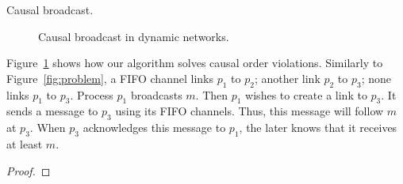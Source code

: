 \begin{algorithm*}[h]
  
  \caption{\label{algo:bufferbroadcast}Causal broadcast.}
\end{algorithm*}

\begin{figure}
  \begin{center}
    
    \caption{\label{fig:solved}Causal broadcast in dynamic networks.}
  \end{center}
\end{figure}

Figure~\ref{fig:solved} shows how our algorithm solves causal order
violations. Similarly to Figure~\ref{fig:problem}, a FIFO channel links $p_1$ to
$p_2$; another link $p_2$ to $p_3$; none links $p_1$ to $p_3$. Process $p_1$
broadcasts $m$. Then $p_1$ wishes to create a link to $p_3$. It sends a message
to $p_3$ using its FIFO channels. Thus, this message will follow $m$ at
$p_3$. When $p_3$ acknowledges this message to $p_1$, the later knows that it
receives at least $m$.


\begin{theorem}
\end{theorem}

\begin{proof}
\end{proof}

